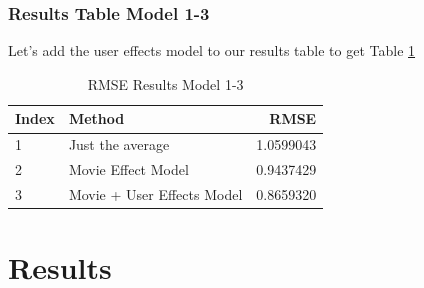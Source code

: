 \documentclass[
]{article}
\newenvironment{Shaded}{}{}
\newcommand{\AttributeTok}[1]{\textcolor[rgb]{0.49,0.56,0.16}{#1}}
\newcommand{\DecValTok}[1]{\textcolor[rgb]{0.25,0.63,0.44}{#1}}
\newcommand{\FloatTok}[1]{\textcolor[rgb]{0.25,0.63,0.44}{#1}}
\newcommand{\FunctionTok}[1]{\textcolor[rgb]{0.02,0.16,0.49}{#1}}
\newcommand{\NormalTok}[1]{#1}
\newcommand{\OtherTok}[1]{\textcolor[rgb]{0.00,0.44,0.13}{#1}}
\newcommand{\SpecialCharTok}[1]{\textcolor[rgb]{0.25,0.44,0.63}{#1}}
\newcommand{\StringTok}[1]{\textcolor[rgb]{0.25,0.44,0.63}{#1}}
\begin{document}
\begin{Shaded}
\end{Shaded}

\newpage

\hypertarget{results-table-model-1-3}{%
\subsubsection{Results Table Model 1-3}\label{results-table-model-1-3}}

Let's add the user effects model to our results table to get Table
\ref{tbl:rmse_results_model_1-3}

\begin{table}[H]

\caption{\label{tab:ue_5}RMSE Results Model 1-3\label{tbl:rmse_results_model_1-3}}
\centering
\fontsize{7}{9}\selectfont
\begin{tabular}[t]{llr}
\toprule
Index & Method & RMSE\\
\midrule
1 & Just the average & 1.0599043\\
2 & Movie Effect Model & 0.9437429\\
3 & Movie + User Effects Model & 0.8659320\\
\bottomrule
\end{tabular}
\end{table}

\newpage

\hypertarget{results}{%
\section{Results}\label{results}}
\end{document}
